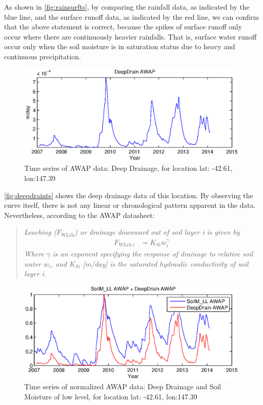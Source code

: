 As shown in \autoref{fig:rainsurfts}, by comparing the rainfall data, as indicated by the blue line, and the surface runoff data, as indicated by the red line, we can confirm that the above statement is correct, because the spikes of surface runoff only occur where there are continuously heavier rainfalls. That is, surface water runoff occur only when the soil moisture is in saturation status due to heavy and continuous precipitation.\\
\begin{figure}[hbt]
\begin{center}
\includegraphics[width=\linewidth]{gfx/deepdraints.eps}
\end{center}
\caption{Time series of AWAP data: Deep Drainage, for location lat: -42.61, lon:147.39}
\label{fig:deepdraints}
\end{figure}
\newline
\autoref{fig:deepdraints} shows the deep drainage data of this location. By observing the curve itself, there is not any linear or chronological pattern apparent in the data. Nevertheless, according to the AWAP datasheet:
\begin{quote}\begin{minipage}{0.9\textwidth}
\emph{Leaching ($F_{\text{WLch}}$) or drainage downward out of soil layer i is given by}
\begin{align}
F_{\text{WLch}~i} &= K_{Si}w_i^\gamma
\label{eq:awapleaching}
\end{align}
\emph{Where $\gamma$ is an exponent specifying the response of drainage to relative soil water $w_i$, and $K_{Si}$ [m/day] is the saturated hydraulic conductivity of soil layer i.}
\end{minipage}\end{quote}
\begin{figure}[hbt]
\begin{center}
\includegraphics[width=\linewidth]{gfx/soilmdeepts.eps}
\end{center}
\caption{Time series of normalized AWAP data: Deep Drainage and Soil Moisture of low level, for location lat: -42.61, lon:147.39}
\label{fig:soilmdeepts}
\end{figure}
